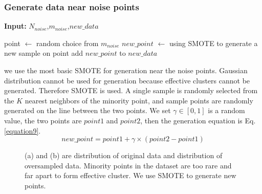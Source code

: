\documentclass[runningheads]{llncs}
\begin{document}
\subsubsection{Generate data near noise points}
\begin{algorithm}[tb]
  \caption{$generate\_noise$}
  \label{alg5}
  \hspace*{0.02in} {\bf Input:} $N_{noise}$,$m_{noise}$,$new\_data$
  \begin{algorithmic}
    \State point $\leftarrow$ random choice from $m_{noise}$
    \State $new\_point$ $\leftarrow$ using SMOTE to generate a new sample on point
    \State add $new\_point$ to $new\_data$
    \EndFor
  \end{algorithmic}
\end{algorithm}
we use the most basic SMOTE for generation near the noise points.
Gaussian distribution cannot be used for generation because effective clusters cannot be generated. 
Therefore SMOTE is used.
A single sample is randomly selected from the $K$ nearest neighbors of the minority point, 
 and sample points are randomly generated on the line between the two points.
 We set $\gamma \in [0,1]$ is a random value, the two points are $point1$ and $point2$,
 then the generation equation is Eq.\ref{equation9}.
 \begin{equation}
  \label{equation9}
  new\_point=point1+\gamma \times (point2-point1)
\end{equation}

\begin{figure}[tb]
  \centering
  \quad
  \caption{(a) and (b) are distribution of original data and distribution of oversampled data.
  Minority points in the dataset are too rare and far apart to form effective cluster. 
  We use SMOTE to generate new points.}
  \label{fig14}
  \end{figure}
\end{document}
